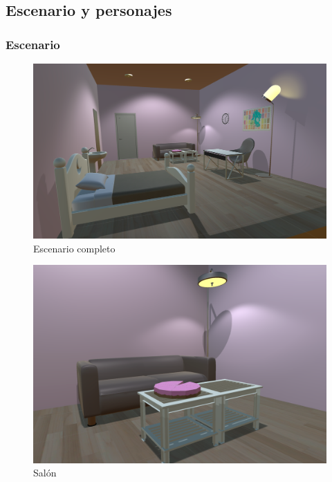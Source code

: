 \documentclass[12pt, a4paper,twoside,titlepage]{book}
\begin{document}
\subsection{Escenario y personajes}
\subsubsection{Escenario}


\begin{figure}
	\centering
	\includegraphics[width=1\linewidth]{TGF/Artes/Escenario.png}
	\caption{Escenario completo}
	\label{fig:ArtesEsce}
\end{figure}

\begin{figure}
	\centering
	\includegraphics[width=.9\linewidth]{TGF/Artes/Saloncito.png}
	\caption{Salón}
	\label{fig:ArtesSalon}
\end{figure}
\end{document}
